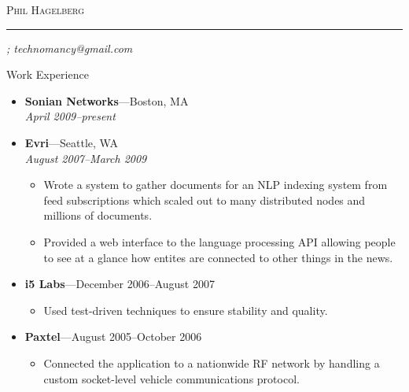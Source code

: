 \documentclass[11pt,oneside]{article}
\makeatletter
\newcommand{\name}{Phil Hagelberg}
\newcommand{\email}{technomancy@gmail.com}
\newcommand{\bigname}[1]{
	\begin{center}\fontfamily{phv}\selectfont\Huge\scshape#1\end{center}
}
\newenvironment{ressection}[1]{
	\vspace{4pt}
	{\fontfamily{phv}\selectfont\Large#1}
	\begin{itemize}
	\vspace{3pt}
}{
	\end{itemize}
}
\newcommand{\resitem}[1]{
	\vspace{-4pt}
	\item \begin{flushleft} #1 \end{flushleft}
}
\newcommand{\ressubitem}[1]{
	\vspace{-1pt}
	\item \begin{flushleft} #1 \end{flushleft}
}
\newcommand{\resbigitem}[3]{
	\vspace{-5pt}
	\item
	\textbf{#1}---#2 \\
	\textit{#3}
}
\newenvironment{ressubsec}[3]{
	\resbigitem{#1}{#2}{#3}
	\vspace{-2pt}
	\begin{itemize}
}{
	\end{itemize}
}
\makeatother
\begin{document}
 \selectfont

\bigname{\name}

\vspace{-8pt} \rule{\textwidth}{1pt}

\vspace{-1pt} {\small\itshape \addr \hfill \phone; \email}

\vspace{8 pt}




\begin{ressection}{Work Experience}

	\begin{ressubsec}{Sonian Networks}{Boston, MA}{April 2009--present}
	\end{ressubsec}

	\begin{ressubsec}{Evri}{Seattle, WA}{August 2007--March 2009}
		\ressubitem{Wrote a system to gather documents for an NLP indexing system from feed subscriptions which scaled out to many distributed nodes and millions of documents.}
		\ressubitem{Provided a web interface to the language processing API allowing people to see at a glance how entites are connected to other things in the news.}
	\end{ressubsec}

    \begin{ressubsec}{i5 Labs}{December 2006--August 2007}
      \ressubitem{Build a social networking site in Rails with a small team.}
      \ressubitem{Used test-driven techniques to ensure stability and quality.}
    \end{ressubsec}

    \begin{ressubsec}{Paxtel}{August 2005--October 2006}
      \ressubitem{Created a test-driven Rails web application to view diagnostics and map location of fleets of vehicles.}
      \ressubitem{Connected the application to a nationwide RF network by handling a custom socket-level vehicle communications protocol.}
    \end{ressubsec}

\end{ressection}



\end{document}

